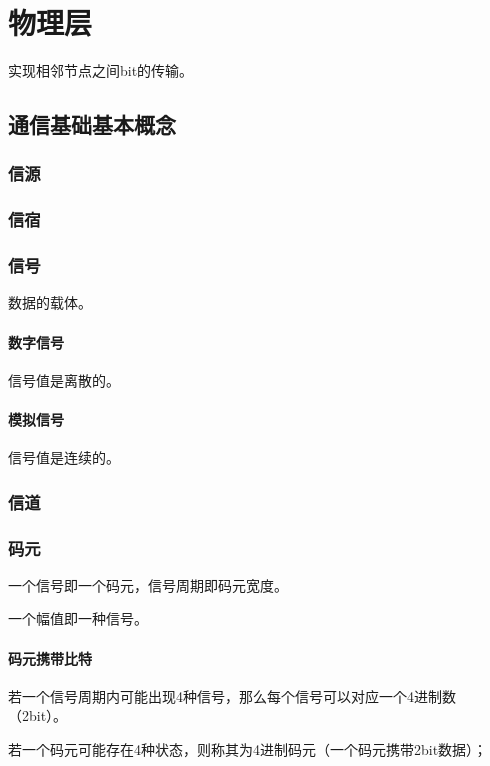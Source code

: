 
\chapter{物理层}

实现相邻节点之间bit的传输。

\section{通信基础基本概念}

\subsection{信源}


\subsection{信宿}


\subsection{信号}
数据的载体。

\subsubsection{数字信号}
信号值是离散的。


\subsubsection{模拟信号}
信号值是连续的。


\subsection{信道}


\subsection{码元}
一个信号即一个码元，信号周期即码元宽度。

一个幅值即一种信号。


\subsubsection{码元携带比特}

若一个信号周期内可能出现4种信号，那么每个信号可以对应一个4进制数（2bit）。

若一个码元可能存在4种状态，则称其为4进制码元（一个码元携带2bit数据）；

